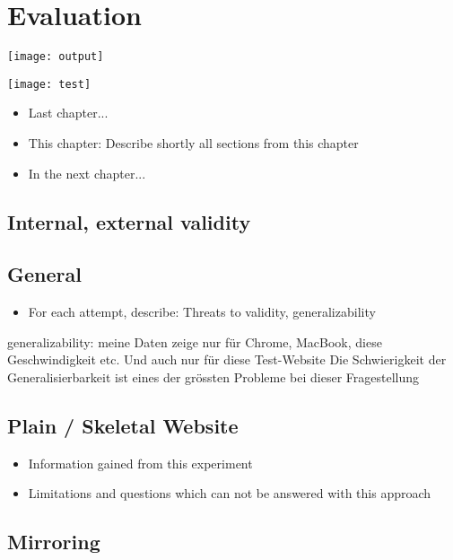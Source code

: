 \chapter{Evaluation}



\texttt{[image: output]}

\texttt{[image: test]}


\begin{itemize}
	\item Last chapter...
	\item This chapter: Describe shortly all sections from this chapter
	\item In the next chapter...
\end{itemize}




\section{Internal, external validity}





\section{General}

\begin{itemize}
    \item For each attempt, describe: Threats to validity, generalizability
\end{itemize}

generalizability: meine Daten zeige nur für Chrome, MacBook, diese Geschwindigkeit etc.
Und auch nur für diese Test-Website
Die Schwierigkeit der Generalisierbarkeit ist eines der grössten Probleme bei dieser Fragestellung

\section{Plain / Skeletal Website}

\begin{itemize}
\item Information gained from this experiment
\item Limitations and questions which can not be answered with this approach
\end{itemize}


\section{Mirroring}


